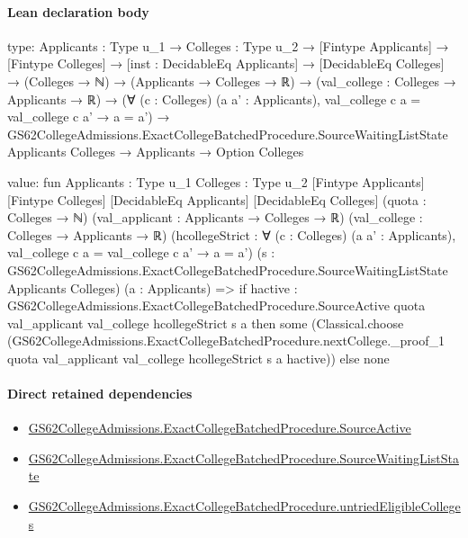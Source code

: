 \documentclass[10pt]{article}
\begin{document}
\paragraph{Lean declaration body}
\begin{ReviewVerbatim}
type:
{Applicants : Type u_1} →
  {Colleges : Type u_2} →
    [Fintype Applicants] →
      [Fintype Colleges] →
        [inst : DecidableEq Applicants] →
          [DecidableEq Colleges] →
            (Colleges → ℕ) →
              (Applicants → Colleges → ℝ) →
                (val_college : Colleges → Applicants → ℝ) →
                  (∀ (c : Colleges) (a a' : Applicants), val_college c a = val_college c a' → a = a') →
                    GS62CollegeAdmissions.ExactCollegeBatchedProcedure.SourceWaitingListState Applicants Colleges →
                      Applicants → Option Colleges

value:
fun {Applicants : Type u_1} {Colleges : Type u_2} [Fintype Applicants] [Fintype Colleges] [DecidableEq Applicants]
    [DecidableEq Colleges] (quota : Colleges → ℕ) (val_applicant : Applicants → Colleges → ℝ)
    (val_college : Colleges → Applicants → ℝ)
    (hcollegeStrict : ∀ (c : Colleges) (a a' : Applicants), val_college c a = val_college c a' → a = a')
    (s : GS62CollegeAdmissions.ExactCollegeBatchedProcedure.SourceWaitingListState Applicants Colleges)
    (a : Applicants) =>
  if hactive :
      GS62CollegeAdmissions.ExactCollegeBatchedProcedure.SourceActive quota val_applicant val_college hcollegeStrict s
        a then
    some
      (Classical.choose
        (GS62CollegeAdmissions.ExactCollegeBatchedProcedure.nextCollege._proof_1 quota val_applicant val_college
          hcollegeStrict s a hactive))
  else none
\end{ReviewVerbatim}

\paragraph{Direct retained dependencies}
\begin{itemize}\raggedright
\item \hyperlink{governing-declaration-65e4bdbeef377fb1}{GS62\allowbreak{}College\allowbreak{}Admissions.\allowbreak{}Exact\allowbreak{}College\allowbreak{}Batched\allowbreak{}Procedure.\allowbreak{}Source\allowbreak{}Active}
\item \hyperlink{governing-declaration-2a222855a7d234b6}{GS62\allowbreak{}College\allowbreak{}Admissions.\allowbreak{}Exact\allowbreak{}College\allowbreak{}Batched\allowbreak{}Procedure.\allowbreak{}Source\allowbreak{}Waiting\allowbreak{}List\allowbreak{}State}
\item \hyperlink{governing-declaration-03751795717f46c8}{GS62\allowbreak{}College\allowbreak{}Admissions.\allowbreak{}Exact\allowbreak{}College\allowbreak{}Batched\allowbreak{}Procedure.\allowbreak{}untried\allowbreak{}Eligible\allowbreak{}Colleges}
\end{itemize}
\hypertarget{governing-declaration-af45c64e4d2fd2f5}{}
\end{document}
